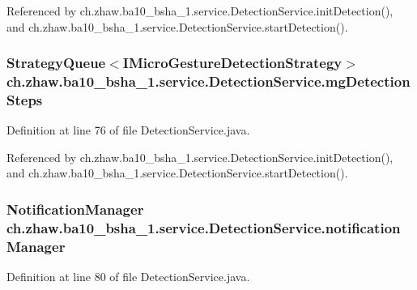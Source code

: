 Referenced by ch.zhaw.ba10\_\-bsha\_\-1.service.DetectionService.initDetection(), and ch.zhaw.ba10\_\-bsha\_\-1.service.DetectionService.startDetection().\hypertarget{classch_1_1zhaw_1_1ba10__bsha__1_1_1service_1_1DetectionService_ace6fc1c597f8789a6f7f8048296799a3}{
\subsubsection[{mgDetectionSteps}]{\setlength{\rightskip}{0pt plus 5cm}StrategyQueue$<${\bf IMicroGestureDetectionStrategy}$>$ {\bf ch.zhaw.ba10\_\-bsha\_\-1.service.DetectionService.mgDetectionSteps}}}
\label{classch_1_1zhaw_1_1ba10__bsha__1_1_1service_1_1DetectionService_ace6fc1c597f8789a6f7f8048296799a3}


Definition at line 76 of file DetectionService.java.

Referenced by ch.zhaw.ba10\_\-bsha\_\-1.service.DetectionService.initDetection(), and ch.zhaw.ba10\_\-bsha\_\-1.service.DetectionService.startDetection().\hypertarget{classch_1_1zhaw_1_1ba10__bsha__1_1_1service_1_1DetectionService_a805b20b9685b173065d4bbceeb3a73d3}{
\subsubsection[{notificationManager}]{\setlength{\rightskip}{0pt plus 5cm}NotificationManager {\bf ch.zhaw.ba10\_\-bsha\_\-1.service.DetectionService.notificationManager}}}
\label{classch_1_1zhaw_1_1ba10__bsha__1_1_1service_1_1DetectionService_a805b20b9685b173065d4bbceeb3a73d3}


Definition at line 80 of file DetectionService.java.

